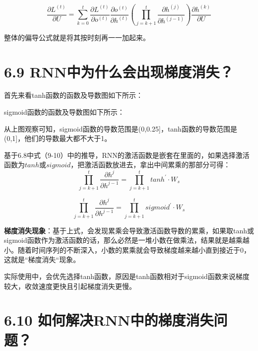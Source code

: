 \[
\frac{\partial L^{(t)}}{\partial U}=\sum_{k=0}^{t}\frac{\partial L^{(t)}}{\partial o^{(t)}}\frac{\partial o^{(t)}}{\partial h^{(t)}}(\prod_{j=k+1}^{t}\frac{\partial h^{(j)}}{\partial h^{(j-1)}})\frac{\partial h^{(k)}}{\partial U}
\]

整体的偏导公式就是将其按时刻再一一加起来。

\section{6.9
RNN中为什么会出现梯度消失？}\label{rnnux4e2dux4e3aux4ec0ux4e48ux4f1aux51faux73b0ux68afux5ea6ux6d88ux5931}

首先来看tanh函数的函数及导数图如下所示：


sigmoid函数的函数及导数图如下所示：


从上图观察可知，sigmoid函数的导数范围是(0,0.25{]}，tanh函数的导数范围是(0,1{]}，他们的导数最大都不大于1。

​
基于6.8中式（9-10）中的推导，RNN的激活函数是嵌套在里面的，如果选择激活函数为\(tanh\)或\(sigmoid\)，把激活函数放进去，拿出中间累乘的那部分可得：
\[
\prod_{j=k+1}^{t}{\frac{\partial{h^{j}}}{\partial{h^{j-1}}}} = \prod_{j=k+1}^{t}{tanh^{'}}\cdot W_{s}
\]

\[
\prod_{j=k+1}^{t}{\frac{\partial{h^{j}}}{\partial{h^{j-1}}}} = \prod_{j=k+1}^{t}{sigmoid^{'}}\cdot W_{s}
\]

​
\textbf{梯度消失现象}：基于上式，会发现累乘会导致激活函数导数的累乘，如果取tanh或sigmoid函数作为激活函数的话，那么必然是一堆小数在做乘法，结果就是越乘越小。随着时间序列的不断深入，小数的累乘就会导致梯度越来越小直到接近于0，这就是``梯度消失``现象。

​
实际使用中，会优先选择tanh函数，原因是tanh函数相对于sigmoid函数来说梯度较大，收敛速度更快且引起梯度消失更慢。

\section{6.10
如何解决RNN中的梯度消失问题？}\label{ux5982ux4f55ux89e3ux51b3rnnux4e2dux7684ux68afux5ea6ux6d88ux5931ux95eeux9898}

